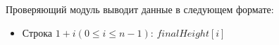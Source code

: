 Проверяющий модуль выводит данные в следующем формате:
\begin{itemize}
\item Строка $1 + i (0 \le i \le n - 1)$: $finalHeight[i]$
\end{itemize}